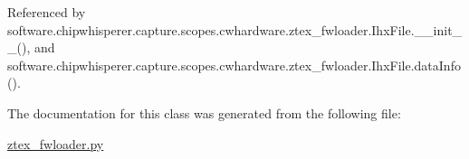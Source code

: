 Referenced by software.\+chipwhisperer.\+capture.\+scopes.\+cwhardware.\+ztex\+\_\+fwloader.\+Ihx\+File.\+\_\+\+\_\+init\+\_\+\+\_\+(), and software.\+chipwhisperer.\+capture.\+scopes.\+cwhardware.\+ztex\+\_\+fwloader.\+Ihx\+File.\+data\+Info().



The documentation for this class was generated from the following file\+:\begin{DoxyCompactItemize}
\item 
\hyperlink{ztex__fwloader_8py}{ztex\+\_\+fwloader.\+py}\end{DoxyCompactItemize}
